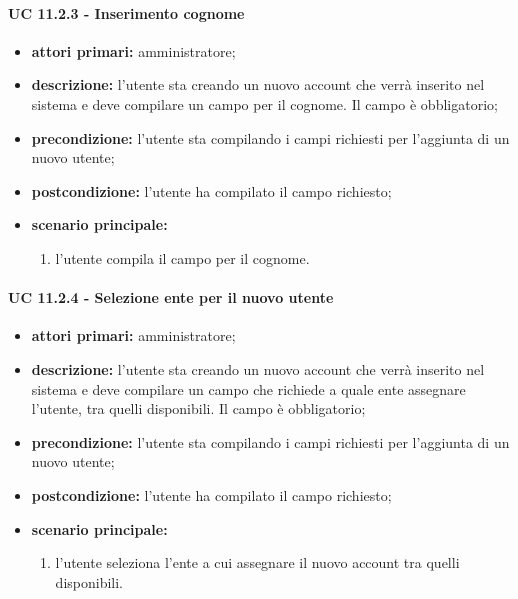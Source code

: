 			\paragraph{UC 11.2.3 - Inserimento cognome}
			\begin{itemize}
				\item \textbf{attori primari:} amministratore;
				\item \textbf{descrizione:} l'utente sta creando un nuovo account che verrà inserito nel sistema e deve compilare un campo per il cognome. Il campo è obbligatorio;
				\item \textbf{precondizione:} l'utente sta compilando i campi richiesti per l'aggiunta di un nuovo utente;
				\item \textbf{postcondizione:} l'utente ha compilato il campo richiesto;
				\item \textbf{scenario principale:}
				\begin{enumerate}
					\item{l'utente compila il campo per il cognome.}
				\end{enumerate}
			\end{itemize}

			\paragraph{UC 11.2.4 - Selezione ente per il nuovo utente}
			\begin{itemize}
				\item \textbf{attori primari:} amministratore;
				\item \textbf{descrizione:} l'utente sta creando un nuovo account che verrà inserito nel sistema e deve compilare un campo che richiede a quale ente assegnare l'utente, tra quelli disponibili. Il campo è obbligatorio;
				\item \textbf{precondizione:} l'utente sta compilando i campi richiesti per l'aggiunta di un nuovo utente;
				\item \textbf{postcondizione:} l'utente ha compilato il campo richiesto;
				\item \textbf{scenario principale:}
				\begin{enumerate}
					\item{l'utente seleziona l'ente a cui assegnare il nuovo account tra quelli disponibili.}
				\end{enumerate}
			\end{itemize}

